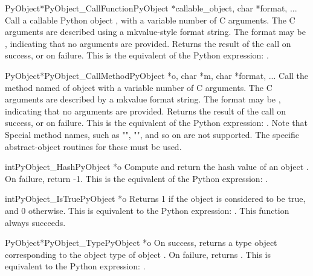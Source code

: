      \begin{cfuncdesc}{PyObject*}{PyObject_CallFunction}{PyObject *callable_object, char *format, ...}
         Call a callable Python object , with a
         variable number of C arguments. The C arguments are described
         using a mkvalue-style format string. The format may be {\NULL},
         indicating that no arguments are provided.  Returns the
         result of the call on success, or {\NULL} on failure.  This is
         the equivalent of the Python expression: .
     \end{cfuncdesc}


     \begin{cfuncdesc}{PyObject*}{PyObject_CallMethod}{PyObject *o, char *m, char *format, ...}
         Call the method named  of object  with a variable number of
         C arguments.  The C arguments are described by a mkvalue
         format string.  The format may be {\NULL}, indicating that no
         arguments are provided. Returns the result of the call on
         success, or {\NULL} on failure.  This is the equivalent of the
         Python expression: .
         Note that Special method names, such as "",
         "", and so on are not supported. The specific
         abstract-object routines for these must be used.
     \end{cfuncdesc}


     \begin{cfuncdesc}{int}{PyObject_Hash}{PyObject *o}
         Compute and return the hash value of an object .  On
         failure, return -1.  This is the equivalent of the Python
         expression: .
     \end{cfuncdesc}


     \begin{cfuncdesc}{int}{PyObject_IsTrue}{PyObject *o}
	 Returns 1 if the object  is considered to be true, and
	 0 otherwise. This is equivalent to the Python expression:
	 .
	 This function always succeeds.
     \end{cfuncdesc}
	 

     \begin{cfuncdesc}{PyObject*}{PyObject_Type}{PyObject *o}
	 On success, returns a type object corresponding to the object
	 type of object . On failure, returns {\NULL}.  This is
	 equivalent to the Python expression: .
     \end{cfuncdesc}

